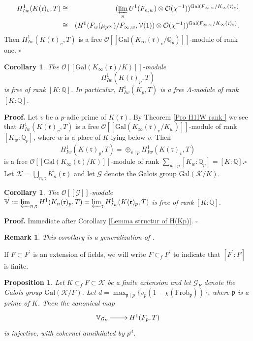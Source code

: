 \documentclass[reqno]{amsart}
\newcounter{dummy} \numberwithin{dummy}{section}
\newtheorem{coro}[dummy]{Corollary}
\newtheorem{pro}[dummy]{Proposition}
\newtheorem{rem}[dummy]{Remark}
\begin{document}
\begin{eqnarray*}
  H^{1}_{Iw}(K(\mathfrak{r})_{v}, T) &\cong &
(\varprojlim_{n}U^{1}(F_{n,w})\otimes\mathcal{O}(\chi^{-1}))^{\mathrm{Gal}(F_{\infty,w}/K_{\infty}(\mathfrak{r})_{v})}  \\
   &\cong& (H^{0}(F_{w}(\mu_{p^{\infty}})/F_{\infty,w},
\mathcal{V}(1))\otimes\mathcal{O}(\chi^{-1}))^{\mathrm{Gal}(F_{\infty,w}/K_{\infty}(\mathfrak{r})_{v})}.
\end{eqnarray*}
Then $ H^{1}_{Iw}(K(\mathfrak{r})_{v}, T)$ is a free
$\mathcal{O}[[\mathrm{Gal}(K_{\infty}(\mathfrak{r})_{v}/\mathbb{Q}_{p})]]$-module
of rank one. \hfill $\square$
\begin{coro}\label{Lemma structur of H(Kp)}
The $\mathcal{O}[[\mathrm{Gal}(K_{\infty}(\mathfrak{r})/K)]]$-module
$$
H^{1}_{Iw}(K(\mathfrak{r})_{p},T)
$$
is free of rank $[K:\mathbb{Q}]$. In particular,
$H^{1}_{Iw}(K_{p},T)$ is a free $\Lambda$-module of rank
$[K:\mathbb{Q}]$.
\end{coro}
\noindent\textbf{Proof.} Let $v$ be a $p$-adic prime of
$K(\mathfrak{r})$. By  Theorem \ref{Pro H1IW rank } we see that
$H^{1}_{Iw}(K(\mathfrak{r})_{v},T)$ is a free
$\mathcal{O}[[\mathrm{Gal}(K_{\infty}(\mathfrak{r})_{v}/K_{w})]]$-module
of rank $[K_{w}:\mathbb{Q}_{p}]$, where $w$ is a place of $K$ lying
below $v$. Then
$$
H^{1}_{Iw}(K(\mathfrak{r})_{p},T)=\oplus_{v\mid
p}H^{1}_{Iw}(K(\mathfrak{r})_{v},T)
$$
 is a free
$\mathcal{O}[[\mathrm{Gal}(K_{\infty}(\mathfrak{r})/K)]]$-module of
rank $\displaystyle{\sum_{w\mid
p}}[K_{w}:\mathbb{Q}_{p}]=[K:\mathbb{Q}] $.\hfill $\square$\vskip
7pt Let $\mathcal{K}=\bigcup_{n,\mathfrak{r}}K_{n}(\mathfrak{r})$
and let $\mathcal{G}$ denote the Galois group
$\mathrm{Gal}(\mathcal{K}/K)$.
\begin{coro}\label{coro the rank of V as Galois module}
The $\mathcal{O}[[\mathcal{G}]]$-module
$\mathbb{V}:=\varprojlim_{n,\mathfrak{r}}H^{1}(K_{n}(\mathfrak{r})_{p},T)=
\varprojlim_{\mathfrak{r}}H^{1}_{Iw}(K(\mathfrak{r})_{p},T)$ is free
of rank $[K:\mathbb{Q}]$.
\end{coro}
\noindent\textbf{Proof.} Immediate after Corollary \ref{Lemma
structur of H(Kp)}. \hfill $\square$\vskip 6pt
\begin{rem}
This corollary is a generalization of \cite[Corollary
3.10]{Kazim109}.
\end{rem}
If $F\subset F^{\prime}$ is an extension of fields, we will write
$F\subset_{f}F^{\prime}$ to indicate that $[F^{\prime}:F]$ is
finite.
\begin{pro}\label{pro  coinvariant and cokernel}
Let $K\subset_{f}F\subset \mathcal{K}$ be a finite extension and let
$\mathcal{G}_{F}$ denote the Galois group
$\mathrm{Gal}(\mathcal{K}/F)$. Let
$d=\displaystyle{\max_{\mathfrak{p}\mid
p}}\{v_{p}(1-\chi(\mathrm{Frob}_{\mathfrak{p}}))\}$, where
$\mathfrak{p}$ is a prime of $K$. Then the canonical map
$$
\xymatrix@=2pc{ \mathbb{V}_{\mathcal{G}_{F}}\ar[r]& H^{1}(F_{p},T)}
$$
is injective, with cokernel annihilated by $p^{d}$.

\end{pro}
\end{document}
